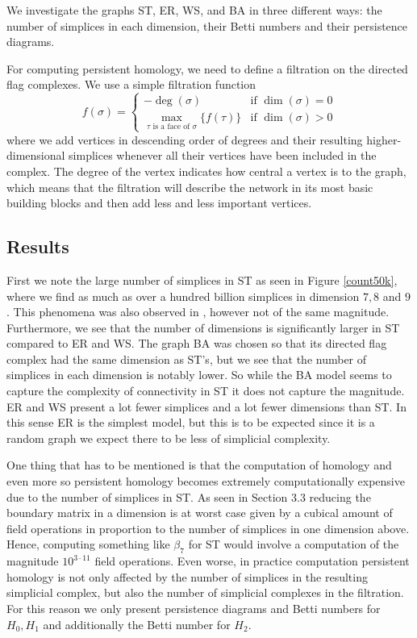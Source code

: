 We investigate the graphs ST, ER, WS, and BA in three different ways: the number of simplices in each dimension, their Betti numbers and their persistence diagrams.

For computing persistent homology, we need to define a filtration on the directed flag complexes.
We use a simple filtration function
\[
  f(\sigma) = \begin{cases}
    -\deg(\sigma) & \text{if } \dim(\sigma) = 0 \\
    \max_{\tau \text{ is a face of } \sigma} \{ f(\tau) \} & \text{if } \dim(\sigma) > 0
  \end{cases}
\] where we add vertices in descending order of degrees and their resulting higher-dimensional simplices whenever all their vertices have been included in the complex. The degree of the vertex indicates how central a vertex is to the graph, which means that the filtration will describe the network in its most basic building blocks and then add less and less important vertices.
\subsection{Results}
First we note the large number of simplices in ST as seen in Figure \ref{count50k}, where we find as much as over a hundred billion simplices in dimension $7,8$ and $9$. This phenomena was also observed in \cite{reimann}, however not of the same magnitude.  Furthermore, we see that the number of dimensions is significantly larger in ST compared to ER and WS. The graph BA was chosen so that its directed flag complex had the same dimension as ST's, but we see that the number of simplices in each dimension is notably lower. So while the BA model seems to capture the complexity of connectivity in ST it does not capture the magnitude. ER and WS present a lot fewer simplices and a lot fewer dimensions than ST. In this sense ER is the simplest model, but this is to be expected since it is a random graph we expect there to be less of simplicial complexity.

One thing that has to be mentioned is that the computation of homology and even more so persistent homology becomes extremely computationally expensive due to the number of simplices in ST. As seen in Section 3.3 reducing the boundary matrix in a dimension is at worst case given by a cubical amount of field operations in proportion to the number of simplices in one dimension above. Hence, computing something like $\beta_{7}$ for ST would involve a computation of the magnitude $10^{3 \cdot 11}$ field operations. Even worse, in practice computation persistent homology is not only affected by the number of simplices in the resulting simplicial complex, but also the number of simplicial complexes in the filtration. For this reason we only present persistence diagrams and Betti numbers for $H_{0},H_{1}$ and additionally the Betti number for $H_{2}$.

